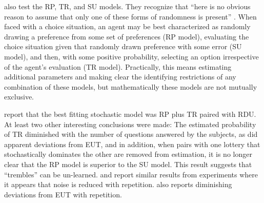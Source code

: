 \textcite{Loomes2002} also test the RP, TR, and SU models.
They recognize that \enquote{here is no obvious reason to assume that only one of these forms of randomness is present} \parencite*[106]{Loomes2002}.{\footnotemark}
When faced with a choice situation, an agent may be best characterized as randomly drawing a preference from some set of preferences (RP model), evaluating the choice situation given that randomly drawn preference with some error (SU model), and then, with some positive probability, selecting an option irrespective of the agent's evaluation (TR model).
Practically, this means estimating additional parameters and making clear the identifying restrictions of any combination of these models, but mathematically these models are not mutually exclusive.{\footnotemark}

\addtocounter{footnote}{-2}

\textcite{Loomes2002} report that the best fitting stochastic model was RP plus TR paired with RDU.
At least two other interesting conclusions were made: The estimated probability of TR diminished with the number of questions answered by the subjects, as did apparent deviations from EUT, and in addition, when pairs with one lottery that stochastically dominates the other are removed from estimation, it is no longer clear that the RP model is superior to the SU model.
This result suggests that \enquote{trembles} can be un-learned.
\textcite{Hey2001} and \textcite{Moffatt2002} report similar results from experiments where it appears that noise is reduced with repetition.
\textcite{Hey2001} also reports diminishing deviations from EUT with repetition.


